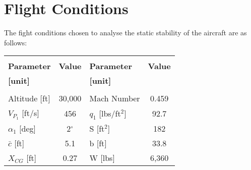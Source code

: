 \documentclass[letterpaper,12pt]{article}
\begin{document}
\section{Flight Conditions}
The fight conditions chosen to analyse the static stability of the aircraft are as follows:
\begin{center}
\begin{tabular}{lclc}
\hline\vspace*{-0.2cm} \\ \vspace*{-0.2cm}
\textbf{Parameter} \hspace*{1.5cm}& \textbf{Value}\hspace*{3cm}& \textbf{Parameter} \hspace*{1.5cm}&  \textbf{Value}\vspace*{-0.3cm}\vspace{0.5cm}\\ \vspace*{0.2cm}
\textbf{[unit]} \hspace*{1.5cm}& \hspace*{3cm}& \textbf{[unit]} \hspace*{1.5cm}& \\ \hline \\
Altitude [ft]&\hspace*{-3cm}  30,000&  Mach Number & 0.459\vspace*{0.2cm}\\ 
$V_{P_1}$ [ft/s]&\hspace*{-3cm}  456& $q_1$ [lbs/ft$^2$]& 92.7\vspace*{0.2cm}\\ 
$\alpha_1$ [deg]&\hspace*{-3cm}  2$^\circ$& S [ft$^2$] & 182\vspace*{0.2cm}\\ 
$\bar{c}$ [ft]&\hspace*{-3cm}  5.1& b [ft] & 33.8\vspace*{0.2cm}\\ 
$X_{CG}$ [ft]&\hspace*{-3cm}  0.27& W [lbs] & 6,360\vspace*{0.3cm}\\ \hline
\end{tabular}
\end{center}
\end{document}
